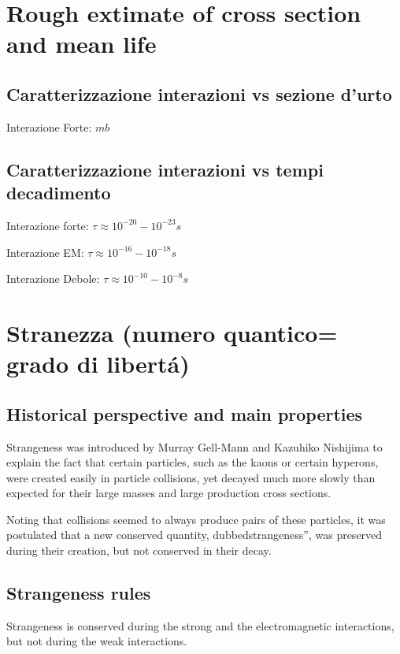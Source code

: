 \documentclass[main.tex]{subfiles}
\begin{document}
\section{Rough extimate of cross section and mean life}

\subsection{Caratterizzazione interazioni vs sezione d'urto}
\begin{itemize*}
\item Interazione Forte: $mb$

\end{itemize*}


\subsection{Caratterizzazione interazioni vs tempi decadimento}
\begin{itemize*}
\item Interazione forte: $\tau\approx10^{-20}-10^{-23}s$
\item Interazione EM: $\tau\approx10^{-16}-10^{-18}s$
\item Interazione Debole: $\tau\approx10^{-10}-10^{-8}s$
\end{itemize*}


\section{Stranezza (numero quantico= grado di libert\'a)}

\subsection{Historical perspective and main properties}

Strangeness was introduced by Murray Gell-Mann and Kazuhiko Nishijima to explain the fact that certain particles, such as the kaons or certain hyperons, were created easily in particle collisions, yet decayed much more slowly than expected for their large masses and large production cross sections.

Noting that collisions seemed to always produce pairs of these particles, it was postulated that a new conserved quantity, dubbedstrangeness'', was preserved during their creation, but not conserved in their decay.


\subsection{Strangeness rules}
Strangeness is conserved during the strong and the electromagnetic interactions, but not during the weak interactions.
\end{document}
